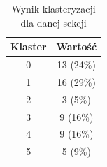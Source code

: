 \documentclass[../EDI_Task2_Karwowski_Kowalewski.tex]{subfiles}
\begin{document}
{{{            \begin{table}[!htbp]
                \small
                \centering
                \begin{tabular}{|c|c|}
                    \hline
                    Klaster & Wartość \\ \hline
                    0   &  13 (24\%) \\
                    1   &  16 (29\%) \\
                    2   &   3 (5\%) \\
                    3   &   9 (16\%) \\
                    4   &   9 (16\%) \\
                    5   &   5 (9\%) \\ \hline
                \end{tabular}
                \caption{Wynik klasteryzacji dla danej sekcji}
            \end{table}
            \FloatBarrier
        }
    }
}
\end{document}
